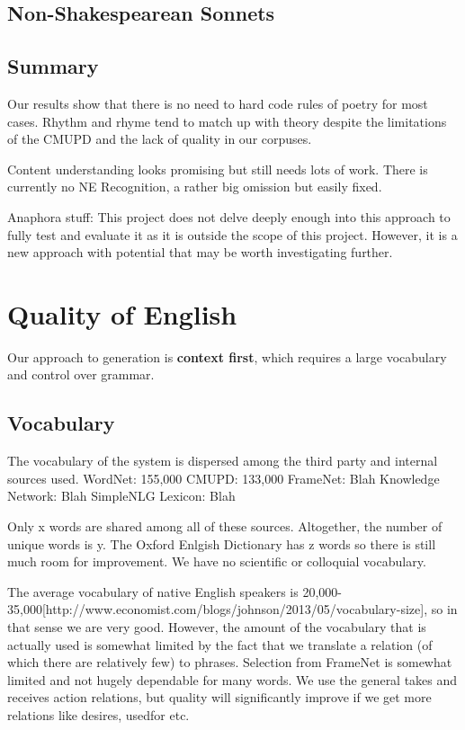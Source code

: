 \subsection{Non-Shakespearean Sonnets}

\subsection{Summary}
Our results show that there is no need to hard code rules of poetry for most cases. Rhythm and rhyme tend to match up with theory despite the limitations of the CMUPD and the lack of quality in our corpuses.

Content understanding looks promising but still needs lots of work. There is currently no NE Recognition, a rather big omission but easily fixed.

Anaphora stuff:
This project does not delve deeply enough into this approach to fully test and evaluate it as it is outside the scope of this project. However, it is a new approach with potential that may be worth investigating further. 


\section{Quality of English}
Our approach to generation is \textbf{context first}, which requires a large vocabulary and control over grammar.
\subsection{Vocabulary}
The vocabulary of the system is dispersed among the third party and internal sources used.
WordNet: 155,000
CMUPD: 133,000
FrameNet: Blah
Knowledge Network: Blah
SimpleNLG Lexicon: Blah

Only x words are shared among all of these sources. Altogether, the number of unique words is y. The Oxford Enlgish Dictionary has z words so there is still much room for improvement. We have no scientific or colloquial vocabulary. 

The average vocabulary of native English speakers is 20,000-35,000[http://www.economist.com/blogs/johnson/2013/05/vocabulary-size], so in that sense we are very good. However, the amount of the vocabulary that is actually used is somewhat limited by the fact that we translate a relation (of which there are relatively few) to phrases. Selection from FrameNet is somewhat limited and not hugely dependable for many words. We use the general takes and receives action relations, but quality will significantly improve if we get more relations like desires, usedfor etc.

